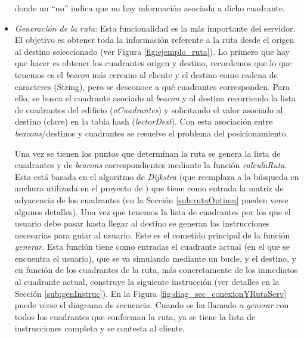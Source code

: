\begin{itemize}
donde un ``no'' indica que no hay información asociada a dicho cuadrante. %
	
	  
	\item \textit{Generación de la ruta:} Esta funcionalidad es la más importante del servidor. El objetivo es obtener toda la información referente a la ruta desde el origen al destino seleccionado (ver Figura \ref{fig:ejemplo_ruta}). Lo primero que hay que hacer es obtener los cuadrantes origen y destino, recordemos que lo que tenemos es el \textit{beacon} más cercano al cliente y el destino como cadena de caracteres (String), pero se desconoce a qué cuadrantes corresponden. Para ello, se busca el cuadrante asociado al \textit{beacon} y al destino recorriendo la lista de cuadrantes del edificio (\textit{aCuadrantes}) y solicitando el valor asociado al destino (clave) en la tabla hash (\textit{lectorDest}). Con esta asociación entre \textit{beacons}/destinos y cuadrantes se resuelve el problema del posicionamiento. 
	
	Una vez se tienen los puntos que determinan la ruta se genera la lista de cuadrantes y de \textit{beacons} correspondientes mediante la función \textit{calculaRuta}. Esta está basada en el algoritmo de \textit{Dijkstra} (que reemplaza a la búsqueda en anchura utilizada en el proyecto de \cite{TFGguia}) que tiene como entrada la matriz de adyacencia de los cuadrantes (en la Sección \ref{sub:rutaOptima} pueden verse algunos detalles). Una vez que tenemos la lista de cuadrantes por los que el usuario debe pasar hasta llegar al destino se generan las instrucciones necesarias para guiar al usuario. Este es el cometido principal de la función \textit{generar}. Esta función tiene como entradas el cuadrante actual (en el que se encuentra el usuario), que se va simulando mediante un bucle, y el destino, y en función de los cuadrantes de la ruta, más concretamente de los inmediatos al cuadrante actual, construye la siguiente instrucción (ver detalles en la Sección \ref{sub:genInstruc}). En la Figura \ref{fig:diag_sec_conexionYRutaServ} puede verse el diagrama de secuencia.	Cuando se ha llamado a \textit{generar} con todos los cuadrantes que conforman la ruta, ya se tiene la lista de instrucciones completa y se contesta al cliente. 
\end{itemize}




